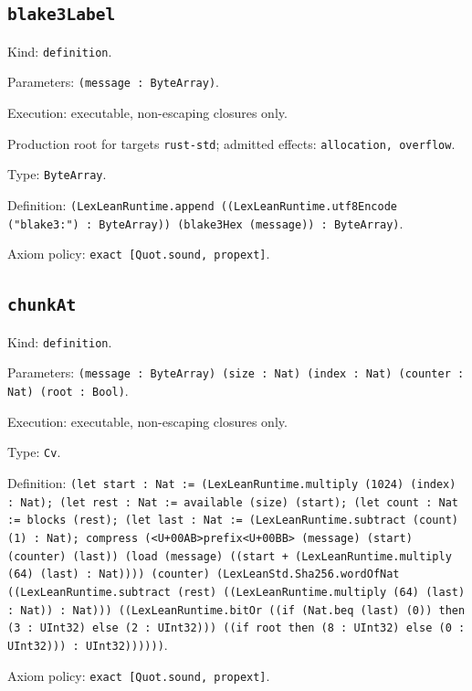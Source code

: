 \documentclass[11pt]{article}
\begin{document}
\subsection*{\texttt{blake3Label}}
\noindent Kind: \texttt{definition}.\par
\noindent Parameters: \texttt{(message : ByteArray)}.\par
\noindent Execution: executable, non-escaping closures only.\par
\noindent Production root for targets \texttt{rust-std}; admitted effects: \texttt{allocation, overflow}.\par
\noindent Type: \texttt{ByteArray}.\par
\noindent Definition: \texttt{(LexLeanRuntime.append ((LexLeanRuntime.utf8Encode ("blake3:") : ByteArray)) (blake3Hex (message)) : ByteArray)}.\par
\noindent Axiom policy: \texttt{exact [Quot.sound, propext]}.\par
\subsection*{\texttt{chunkAt}}
\noindent Kind: \texttt{definition}.\par
\noindent Parameters: \texttt{(message : ByteArray) (size : Nat) (index : Nat) (counter : Nat) (root : Bool)}.\par
\noindent Execution: executable, non-escaping closures only.\par
\noindent Type: \texttt{Cv}.\par
\noindent Definition: \texttt{(let start : Nat := (LexLeanRuntime.multiply (1024) (index) : Nat); (let rest : Nat := available (size) (start); (let count : Nat := blocks (rest); (let last : Nat := (LexLeanRuntime.subtract (count) (1) : Nat); compress (<U+00AB>prefix<U+00BB> (message) (start) (counter) (last)) (load (message) ((start + (LexLeanRuntime.multiply (64) (last) : Nat)))) (counter) (LexLeanStd.Sha256.wordOfNat ((LexLeanRuntime.subtract (rest) ((LexLeanRuntime.multiply (64) (last) : Nat)) : Nat))) ((LexLeanRuntime.bitOr ((if (Nat.beq (last) (0)) then (3 : UInt32) else (2 : UInt32))) ((if root then (8 : UInt32) else (0 : UInt32))) : UInt32))))))}.\par
\noindent Axiom policy: \texttt{exact [Quot.sound, propext]}.\par
\end{document}
